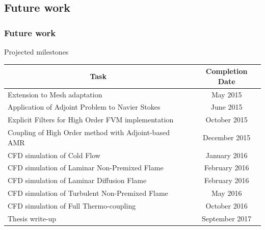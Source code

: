 \documentclass{beamer}
\begin{document}
\subsection[Future]{Future work}
\begin{frame}%
\frametitle{Future work}
\scriptsize


\begin{minipage}[t][1\textheight]{1\textwidth}
\vspace{-20pt}
\begin{exampleblock}{Projected milestones}

\begin{tabular}{|l|c|} \hline
\multicolumn{1}{|c|}{\bf{Task}} & \multicolumn{1}{|c|}{\bf{Completion Date}} \\

\hline Extension to Mesh adaptation & May 2015\\

\hline Application of Adjoint Problem to Navier Stokes  & June 2015\\

\hline Explicit Filters for High Order FVM implementation  & October 2015\\

\hline Coupling of High Order method with Adjoint-based AMR & December 2015\\

\hline CFD simulation of Cold Flow & January 2016\\

\hline CFD simulation of Laminar Non-Premixed Flame & February 2016\\

\hline CFD simulation of Laminar Diffusion Flame & February 2016\\

\hline CFD simulation of Turbulent Non-Premixed Flame & May 2016\\

\hline CFD simulation of Full Thermo-coupling & October 2016\\

\hline Thesis write-up & September 2017 \\ 

\hline

\end{tabular}

\end{exampleblock}
\end{minipage}





\end{frame}
\end{document}
